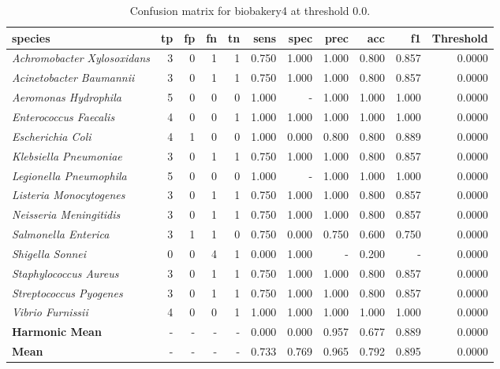 \begin{table}[H]
\centering
\label{tab:conf_biobakery4}
\begin{tabular}{lrrrrrrrrrr}
\hline
\textbf{species} & \textbf{tp} & \textbf{fp} & \textbf{fn} & \textbf{tn} & \textbf{sens} & \textbf{spec} & \textbf{prec} & \textbf{acc} & \textbf{f1} & \textbf{Threshold} \\
\hline
\itshape Achromobacter Xylosoxidans & 3 & 0 & 1 & 1 & 0.750 & 1.000 & 1.000 & 0.800 & 0.857 & 0.0000 \\
\itshape Acinetobacter Baumannii & 3 & 0 & 1 & 1 & 0.750 & 1.000 & 1.000 & 0.800 & 0.857 & 0.0000 \\
\itshape Aeromonas Hydrophila & 5 & 0 & 0 & 0 & 1.000 & - & 1.000 & 1.000 & 1.000 & 0.0000 \\
\itshape Enterococcus Faecalis & 4 & 0 & 0 & 1 & 1.000 & 1.000 & 1.000 & 1.000 & 1.000 & 0.0000 \\
\itshape Escherichia Coli & 4 & 1 & 0 & 0 & 1.000 & 0.000 & 0.800 & 0.800 & 0.889 & 0.0000 \\
\itshape Klebsiella Pneumoniae & 3 & 0 & 1 & 1 & 0.750 & 1.000 & 1.000 & 0.800 & 0.857 & 0.0000 \\
\itshape Legionella Pneumophila & 5 & 0 & 0 & 0 & 1.000 & - & 1.000 & 1.000 & 1.000 & 0.0000 \\
\itshape Listeria Monocytogenes & 3 & 0 & 1 & 1 & 0.750 & 1.000 & 1.000 & 0.800 & 0.857 & 0.0000 \\
\itshape Neisseria Meningitidis & 3 & 0 & 1 & 1 & 0.750 & 1.000 & 1.000 & 0.800 & 0.857 & 0.0000 \\
\itshape Salmonella Enterica & 3 & 1 & 1 & 0 & 0.750 & 0.000 & 0.750 & 0.600 & 0.750 & 0.0000 \\
\itshape Shigella Sonnei & 0 & 0 & 4 & 1 & 0.000 & 1.000 & - & 0.200 & - & 0.0000 \\
\itshape Staphylococcus Aureus & 3 & 0 & 1 & 1 & 0.750 & 1.000 & 1.000 & 0.800 & 0.857 & 0.0000 \\
\itshape Streptococcus Pyogenes & 3 & 0 & 1 & 1 & 0.750 & 1.000 & 1.000 & 0.800 & 0.857 & 0.0000 \\
\itshape Vibrio Furnissii & 4 & 0 & 0 & 1 & 1.000 & 1.000 & 1.000 & 1.000 & 1.000 & 0.0000 \\
\bfseries Harmonic Mean & - & - & - & - & 0.000 & 0.000 & 0.957 & 0.677 & 0.889 & 0.0000 \\
\bfseries Mean & - & - & - & - & 0.733 & 0.769 & 0.965 & 0.792 & 0.895 & 0.0000 \\
\end{tabular}
\caption{Confusion matrix for biobakery4 at threshold 0.0.}
\end{table}
